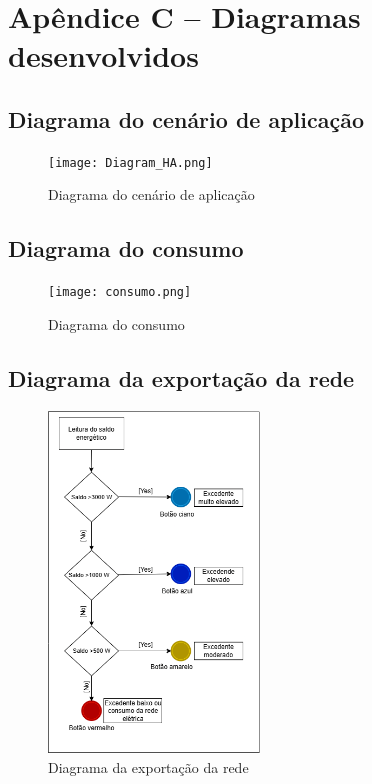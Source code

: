 \chapter{Apêndice C – Diagramas desenvolvidos
}


\section{Diagrama do cenário de aplicação}




\begin{figure}[H]
    \centering
    \texttt{[image: Diagram\_HA.png]}
    \caption{Diagrama do cenário de aplicação}
    \label{fig:Diagram_HA.png}
\end{figure}

\newpage

\section{Diagrama do consumo}



\begin{figure}[H]
    \centering
    \texttt{[image: consumo.png]}
    \caption{Diagrama do consumo}
    \label{fig:consumo.png}
\end{figure}


\newpage

\section{Diagrama da exportação da rede}


\begin{figure}[H]
    \centering
    \includegraphics[width=0.5\textwidth]{images/Saldo_Botao_Energetico_diagrama.drawio.png}
    \caption{Diagrama da exportação da rede}
    \label{fig:Saldo_Botao_Energetico_diagrama.drawio.png}
\end{figure}
